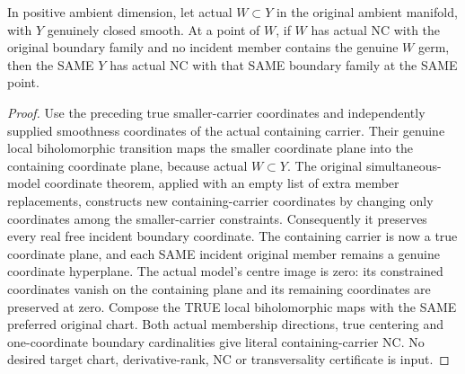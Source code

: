 \begin{theorem}
\label{hir:sharp-actual-nested-normal-crossings-inheritance-lemma-12-7}
\leanok
In positive ambient dimension, let actual $W\subset Y$ in the original ambient manifold, with $Y$ genuinely
closed smooth. At a point of $W$, if $W$ has actual NC with the original boundary
family and no incident member contains the genuine $W$ germ, then the SAME
$Y$ has actual NC with that SAME boundary family at the SAME point.
\end{theorem}
\begin{proof}
Use the preceding true smaller-carrier coordinates and independently supplied
smoothness coordinates of the actual containing carrier. Their genuine local
biholomorphic transition maps the smaller coordinate plane into the containing
coordinate plane, because actual $W\subset Y$. The original simultaneous-model
coordinate theorem, applied with an empty list of extra member replacements,
constructs new containing-carrier coordinates by changing only coordinates
among the smaller-carrier constraints. Consequently it preserves every real
free incident boundary coordinate. The containing carrier is now a true
coordinate plane, and each SAME incident original member remains a genuine
coordinate hyperplane. The actual model's centre image is zero: its constrained
coordinates vanish on the containing plane and its remaining coordinates are
preserved at zero. Compose the TRUE local biholomorphic maps with the SAME
preferred original chart. Both actual membership directions, true centering
and one-coordinate boundary cardinalities give literal containing-carrier NC.
No desired target chart, derivative-rank, NC or transversality certificate is input.
\end{proof}

